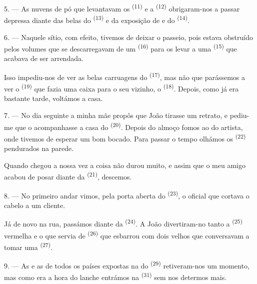 5. --- As nuvens de pó que levantavam os 
\textsuperscript{(11)} e a  \textsuperscript{(12)} obrigaram-nos a
passar depressa diante das belas  do 
\textsuperscript{(13)} e da exposição de  e  do
 \textsuperscript{(14)}.

6. --- Naquele sítio, com efeito, tivemos de deixar o passeio, pois estava
obstruído pelos volumes que se descarregavam de um  \textsuperscript{(16)} para os levar a uma 
\textsuperscript{(15)} que acabava de ser arrendada.

Isso impediu-nos de ver as belas carruagens do 
\textsuperscript{(17)}, mas não que parássemos a ver o 
\textsuperscript{(19)} que fazia uma caixa para o seu vizinho, o  \textsuperscript{(18)}. Depois, como já era bastante
tarde, voltámos a casa.

\VUsaut{3.0mm}

7. --- No dia seguinte a minha mãe propôs que João tirasse um retrato, e
pediu-me que o acompanhasse a casa do  \textsuperscript{(20)}.
Depois do almoço fomos ao  do artista, onde tivemos de
esperar um bom bocado. Para passar o tempo olhámos os 
\textsuperscript{(22)} pendurados na parede.

Quando chegou a nossa vez a coisa não durou muito, e assim que o meu
amigo acabou de posar diante da  \textsuperscript{(21)}, descemos.

8. --- No primeiro andar vimos, pela porta aberta do 
\textsuperscript{(23)}, o oficial que cortava o cabelo a um cliente.

Já de novo na rua, passámos diante da  \textsuperscript{(24)}. A
João divertiram-no tanto a  \textsuperscript{(25)} vermelha e o
 que servia de  \textsuperscript{(26)} que
esbarrou com dois velhos que conversavam a tomar uma  \textsuperscript{(27)}.

\VUsaut{3.0mm}

9. --- As  e as  de todos os países expostas na
 do  \textsuperscript{(29)} retiveram-nos um
momento, mas como era a hora do lanche entrámos na 
\textsuperscript{(31)} sem nos determos mais.

